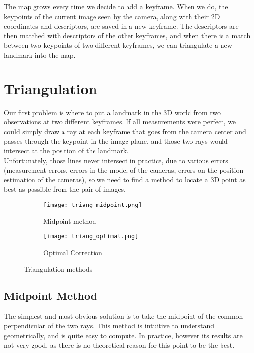 The map grows every time we decide to add a keyframe. When we do, the keypoints of the current image seen by the camera, along with their 2D coordinates and descriptors, are saved in a new keyframe. The descriptors are then matched with descriptors of the other keyframes, and when there is a match between two keypoints of two different keyframes, we can triangulate a new landmark into the map.\\

\section{Triangulation} \label{sec:triangulation}
Our first problem is where to put a landmark in the 3D world from two observations at two different keyframes. If all measurements were perfect, we could simply draw a ray at each keyframe that goes from the camera center and passes through the keypoint in the image plane, and those two rays would intersect at the position of the landmark. \\

Unfortunately, those lines never intersect in practice, due to various errors (measurement errors, errors in the model of the cameras, errors on the position estimation of the cameras), so we need to find a method to locate a 3D point as best as possible from the pair of images.

\begin{figure}[H]
\centering
\begin{subfigure}{.5\textwidth}
  \centering
  \texttt{[image: triang\_midpoint.png]}
  \caption{Midpoint method}
  \label{fig:midpoint}
\end{subfigure}%
\begin{subfigure}{.5\textwidth}
  \centering
  \texttt{[image: triang\_optimal.png]}
  \caption{Optimal Correction}
  \label{fig:optimalcorrection}
\end{subfigure}%

\caption{Triangulation methods}
\label{fig:triang}
\end{figure}

\subsection{Midpoint Method}
The simplest and most obvious solution is to take the midpoint of the common perpendicular of the two rays. This method is intuitive to understand geometrically, and is quite easy to compute. In practice, however its results are not very good, as there is no theoretical reason for this point to be the best.

